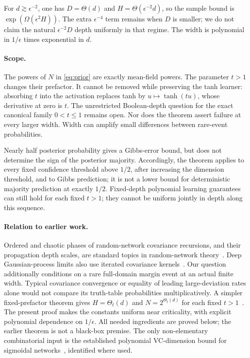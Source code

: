 \documentclass[11pt]{article}
\begin{document}
For $d\gtrsim\epsilon^{-2}$, one has $D=\Theta(d)$ and $H=\Theta(\epsilon^{-2}d)$, so the sample bound is $\exp(\Omega(\epsilon^2H))$. The extra $\epsilon^{-4}$ term remains when $D$ is smaller; we do not claim the natural $\epsilon^{-2}D$ depth uniformly in that regime. The width is polynomial in $1/\epsilon$ times exponential in $d$.

\paragraph{Scope.}
The powers of $N$ in \eqref{eq:prior} are exactly mean-field powers. The parameter $t>1$ changes their prefactor. It cannot be removed while preserving the tanh learner: absorbing $t$ into the activation replaces tanh by $u\mapsto\tanh(tu)$, whose derivative at zero is $t$. The unrestricted Boolean-depth question for the exact canonical family $0<t\le1$ remains open. Nor does the theorem assert failure at every larger width. Width can amplify small differences between rare-event probabilities.

Nearly half posterior probability gives a Gibbs-error bound, but does not determine the sign of the posterior majority. Accordingly, the theorem applies to every fixed confidence threshold above $1/2$, after increasing the dimension threshold, and to Gibbs prediction; it is not a lower bound for deterministic majority prediction at exactly $1/2$. Fixed-depth polynomial learning guarantees can still hold for each fixed $t>1$; they cannot be uniform jointly in depth along this sequence.

\paragraph{Relation to earlier work.}
Ordered and chaotic phases of random-network covariance recursions, and their propagation depth scales, are standard topics in random-network theory~\cite{poole,schoenholz}. Deep Gaussian-process limits also use iterated covariance kernels~\cite{lee}. Our question additionally conditions on a rare full-domain margin event at an actual finite width. Typical covariance convergence or equality of leading large-deviation rates alone would not compare its truth-table probabilities multiplicatively.
A simpler fixed-prefactor theorem gives $H=\Theta_t(d)$ and $N=2^{\Theta_t(d)}$ for each fixed $t>1$~\cite{fixed}. The present proof makes the constants uniform near criticality, with explicit polynomial dependence on $1/\epsilon$. All needed ingredients are proved below; the earlier theorem is not a black-box premise. The only non-elementary combinatorial input is the established polynomial VC-dimension bound for sigmoidal networks~\cite{km}, identified where used.
\end{document}

